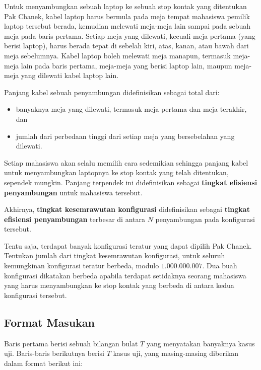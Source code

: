 \documentclass[../main_problemset.tex]{subfiles} %
\begin{document}
Untuk menyambungkan sebuah laptop ke sebuah stop kontak yang ditentukan Pak Chanek, kabel laptop harus bermula pada meja tempat mahasiswa pemilik laptop tersebut berada, kemudian melewati meja-meja lain sampai pada sebuah meja pada baris pertama. Setiap meja yang dilewati, kecuali meja pertama (yang berisi laptop), harus berada tepat di sebelah kiri, atas, kanan, atau bawah dari meja sebelumnya. Kabel laptop boleh melewati meja manapun, termasuk meja-meja lain pada baris pertama, meja-meja yang berisi laptop lain, maupun meja-meja yang dilewati kabel laptop lain.

Panjang kabel sebuah penyambungan didefinisikan sebagai total dari:

\begin{itemize}
	\item banyaknya meja yang dilewati, termasuk meja pertama dan meja terakhir, dan
	\item jumlah dari perbedaan tinggi dari setiap meja yang bersebelahan yang dilewati.
\end{itemize}

Setiap mahasiswa akan selalu memilih cara sedemikian sehingga panjang kabel untuk menyambungkan laptopnya ke stop kontak yang telah ditentukan, sependek mungkin. Panjang terpendek ini didefinisikan sebagai \textbf{tingkat efisiensi penyambungan} untuk mahasiswa tersebut.

Akhirnya, \textbf{tingkat kesemrawutan konfigurasi} didefinisikan sebagai \textbf{tingkat efisiensi penyambungan} terbesar di antara $ N $ penyambungan pada konfigurasi tersebut.

Tentu saja, terdapat banyak konfigurasi teratur yang dapat dipilih Pak Chanek. Tentukan jumlah dari tingkat kesemrawutan konfigurasi, untuk seluruh kemungkinan konfigurasi teratur berbeda, modulo $ 1.000.000.007 $. Dua buah konfigurasi dikatakan berbeda apabila terdapat setidaknya seorang mahasiswa yang harus menyambungkan ke stop kontak yang berbeda di antara kedua konfigurasi tersebut.

\pagebreak
\subsection*{Format Masukan}

Baris pertama berisi sebuah bilangan bulat $ T $ yang menyatakan banyaknya kasus uji. Baris-baris berikutnya berisi $ T $ kasus uji, yang masing-masing diberikan dalam format berikut ini:
\end{document}
